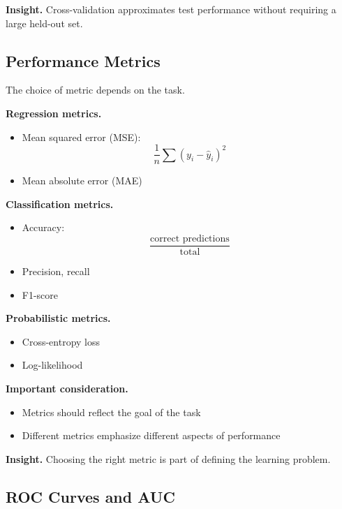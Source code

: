 \medskip

\noindent
\textbf{Insight.}  
Cross-validation approximates test performance without requiring a large held-out set.

\subsection{Performance Metrics}

The choice of metric depends on the task.

\medskip

\noindent
\textbf{Regression metrics.}
\begin{itemize}
    \item Mean squared error (MSE):
    \[
    \frac{1}{n} \sum (y_i - \hat{y}_i)^2
    \]
    \item Mean absolute error (MAE)
\end{itemize}

\medskip

\noindent
\textbf{Classification metrics.}

\begin{itemize}
    \item Accuracy:
    \[
    \frac{\text{correct predictions}}{\text{total}}
    \]
    \item Precision, recall
    \item F1-score
\end{itemize}

\medskip

\noindent
\textbf{Probabilistic metrics.}
\begin{itemize}
    \item Cross-entropy loss
    \item Log-likelihood
\end{itemize}

\medskip

\noindent
\textbf{Important consideration.}
\begin{itemize}
    \item Metrics should reflect the goal of the task
    \item Different metrics emphasize different aspects of performance
\end{itemize}

\medskip

\noindent
\textbf{Insight.}  
Choosing the right metric is part of defining the learning problem.

\subsection{ROC Curves and AUC}

